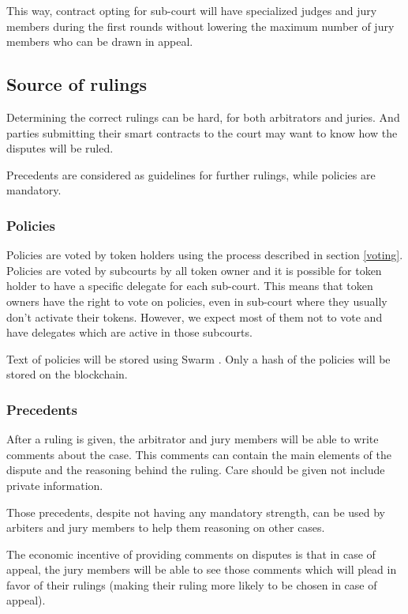 \documentclass[12 pt]{article}
\begin{document}
This way, contract opting for sub-court will have specialized judges and jury members during the first rounds without lowering the maximum number of jury members who can be drawn in appeal.

\subsection{Source of rulings}

Determining the correct rulings can be hard, for both arbitrators and juries. And parties submitting their smart contracts to the court may want to know how the disputes will be ruled.

Precedents are considered as guidelines for further rulings, while policies are mandatory.

\subsubsection{Policies}
\label{policy}

Policies are voted by token holders using the process described in section \ref{voting}.
Policies are voted by subcourts by all token owner and it is possible for token holder to have a specific delegate for each sub-court.
This means that token owners have the right to vote on policies, even in sub-court where they usually don't activate their tokens. However, we expect most of them not to vote and have delegates which are active in those subcourts.

Text of policies will be stored using Swarm \cite{swarm}. Only a hash of the policies will be stored on the blockchain.

\subsubsection{Precedents}

After a ruling is given, the arbitrator and jury members will be able to write comments about the case. This comments can contain the main elements of the dispute and the reasoning behind the ruling. Care should be given not include private information.

Those precedents, despite not having any mandatory strength, can be used by arbiters and jury members to help them reasoning on other cases.

The economic incentive of providing comments on disputes is that in case of appeal, the jury members will be able to see those comments which will plead in favor of their rulings (making their ruling more likely to be chosen in case of appeal).
\end{document}
